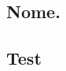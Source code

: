 \documentclass[tcc/et]{faeng}
\begin{document}


\begin{anexosenv}
\partanexos  %
\chapter{Nome.} %

\section{Test} %

\end{anexosenv}
\end{document}
